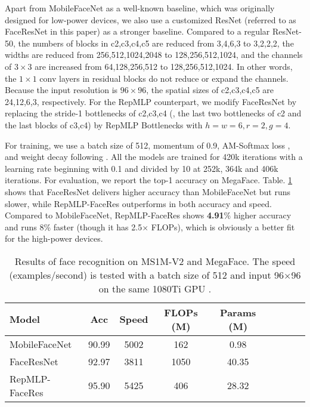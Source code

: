 \documentclass[10pt,twocolumn,letterpaper]{article}
\begin{document}
Apart from MobileFaceNet \cite{chen2018mobilefacenets} as a well-known baseline, which was originally designed for low-power devices, we also use a customized ResNet (referred to as FaceResNet in this paper) as a stronger baseline. Compared to a regular ResNet-50, the numbers of blocks in c2,c3,c4,c5 are reduced from 3,4,6,3 to 3,2,2,2, the widths are reduced from 256,512,1024,2048 to 128,256,512,1024, and the channels of $3\times3$ are increased from 64,128,256,512 to 128,256,512,1024. In other words, the $1\times1$ conv layers in residual blocks do not reduce or expand the channels. Because the input resolution is $96\times96$, the spatial sizes of c2,c3,c4,c5 are 24,12,6,3, respectively. For the RepMLP counterpart, we modify FaceResNet by replacing the stride-1 bottlenecks of c2,c3,c4 (\ie, the last two bottlenecks of c2 and the last blocks of c3,c4) by RepMLP Bottlenecks with $h=w=6,r=2,g=4$.

For training, we use a batch size of 512, momentum of 0.9, AM-Softmax loss \cite{wang2018additive}, and weight decay following \cite{chen2018mobilefacenets}. All the models are trained for 420k iterations with a learning rate beginning with 0.1 and divided by 10 at 252k, 364k and 406k iterations. For evaluation, we report the top-1 accuracy on MegaFace. Table. \ref{table-face} shows that FaceResNet delivers higher accuracy than MobileFaceNet but runs slower, while RepMLP-FaceRes outperforms in both accuracy and speed. Compared to MobileFaceNet, RepMLP-FaceRes shows \textbf{4.91}\% higher accuracy and runs 8\% faster (though it has 2.5$\times$ FLOPs), which is obviously a better fit for the high-power devices.

\setlength{\tabcolsep}{4pt}
\begin{table}
	\caption{Results of face recognition on MS1M-V2 and MegaFace. The speed (examples/second) is tested with a batch size of 512 and input 96$\times$96 on the same 1080Ti GPU .}
	\label{table-face}
	\vspace{-0.2in}
	\begin{center}
		\small
		\begin{tabular}{lcccccccc}
			\hline
			Model					&	Acc		&	 Speed		&	FLOPs (M)	&	Params (M) 	\\
			\hline
			MobileFaceNet			&	90.99		&	5002		&	162			&	0.98	\\
			FaceResNet				&	92.97		&	3811		&	1050		&	40.35		\\	
			RepMLP-FaceRes			&	95.90		&	5425		&	406			&	28.32	\\
			\hline
		\end{tabular}
	\end{center}
	\vspace{-0.25in}
\end{table}
\setlength{\tabcolsep}{1.4pt}
\end{document}

